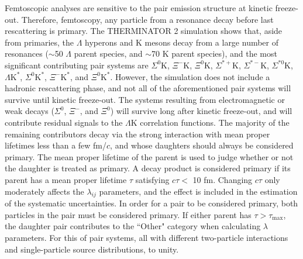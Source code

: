 \documentclass[ALICE,manyauthors]{cernphprep}
\newcommand{\Lam}{$\Lambda$\xspace}
\newcommand{\LamK}{$\Lambda$K\xspace}
\begin{document}
Femtoscopic analyses are sensitive to the pair emission structure at kinetic freeze-out.
Therefore, {\color{red}{in the eyes of}} {\color{blue}{within}} femtoscopy, any particle {\color{red}{born}} {\color{blue}{which originates}} from a resonance decay before last rescattering is {\color{red}{seen as}} {\color{blue}{considered}} primary.
The THERMINATOR 2 simulation shows that, aside from primaries, the \Lam hyperons and K mesons decay from a large number of resonances ($\sim$50 \Lam parent species, and $\sim$70 K parent species), and the most significant contributing pair systems are $\Sigma^{0}$K, $\Xi^{-}$K, $\Xi^{0}$K, $\Sigma^{*+}$K, $\Sigma^{*-}$K, $\Sigma^{*0}$K, $\Lambda\mathrm{K}^{*}$, $\Sigma^{0}\mathrm{K}^{*}$, $\Xi^{-}\mathrm{K}^{*}$, and $\Xi^{0}\mathrm{K}^{*}$.
However, the simulation does not include a hadronic rescattering phase, and not all of the aforementioned pair systems will survive until kinetic freeze-out.
The systems resulting from electromagnetic or weak decays ($\Sigma^{0}$, $\Xi^{-}$, and $\Xi^{0}$) will survive long after kinetic freeze-out, and will contribute residual signals to the \LamK correlation functions.
The majority of the remaining contributors decay via the strong interaction with mean proper lifetimes less than a few fm/$c$, and whose daughters should always be considered primary.
The mean proper lifetime of the parent is used to judge whether or not the daughter is treated as primary.
A decay product is considered primary if its parent has a mean proper lifetime $\tau$ satisfying $c\tau <$ 10 fm.
Changing $c\tau$ only moderately affects the $\lambda_{ij}$ parameters, and the effect is included in the estimation of the systematic uncertainties.
In order for a pair to be considered primary, both particles in the pair must be considered primary. 
If either parent has $\tau > \tau_{\mathrm{max}}$, the daughter pair contributes to the ``Other" category when calculating $\lambda$ parameters.
For this {\color{red}{hodgepodge}} {\color{blue}{mixture}} of pair systems, all with different two-particle interactions and single-particle source distributions, {\color{red}{we assume the net correlation effect averages}} {\color{blue}{the net correlation effect is assumed to average}} to unity.
\end{document}
